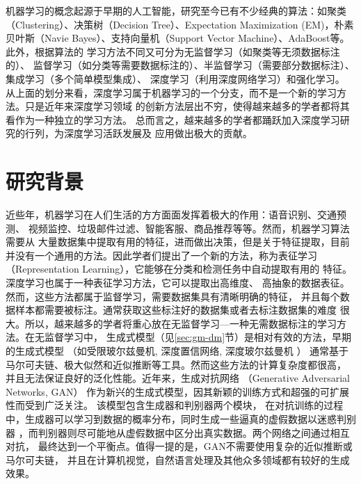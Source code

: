 机器学习的概念起源于早期的人工智能，研究至今已有不少经典的算法：如聚类（Clustering）、决策树（Decision Tree）、Expectation Maximization (EM)，朴素贝叶斯（Navie Bayes）、支持向量机（Support Vector Machine）、AdaBoost等。此外，根据算法的
学习方法不同又可分为无监督学习（如聚类等无须数据标注的）、
监督学习（如分类等需要数据标注的）、半监督学习（需要部分数据标注）、
集成学习（多个简单模型集成）、
深度学习（利用深度网络学习）和强化学习。
从上面的划分来看，深度学习属于机器学习的一个分支，而不是一个新的学习方法。只是近年来深度学习领域
的创新方法层出不穷，使得越来越多的学者都将其看作为一种独立的学习方法。
总而言之，越来越多的学者都踊跃加入深度学习研究的行列，为深度学习活跃发展及
应用做出极大的贡献。

\section{研究背景}
近些年，机器学习在人们生活的方方面面发挥着极大的作用：语音识别、交通预测、
视频监控、垃圾邮件过滤、智能客服、商品推荐等等。然而，机器学习算法需要从
大量数据集中提取有用的特征，进而做出决策，但是关于特征提取，目前并没有一个通用的方法。因此学者们提出了一个新的方法，称为表征学习
（Representation Learning），它能够在分类和检测任务中自动提取有用的
特征\cite{bengio2013representation}。
深度学习也属于一种表征学习方法，它可以提取出高维度、
高抽象的数据表征。然而，这些方法都属于监督学习，需要数据集具有清晰明确的特征，
并且每个数据样本都需要被标注。通常获取这些标注好的数据集或者去标注数据集的难度
很大。所以，越来越多的学者将重心放在无监督学习—一种无需数据标注的学习方法。在无监督学习中，
生成式模型（见\ref{sec:gm-dm}节）是相对有效的方法，早期的生成式模型
（如受限玻尔兹曼机\cite{smolensky1986information},
深度置信网络\cite{hinton2006fast}, 深度玻尔兹曼机\cite{salakhutdinov2009deep}
）
通常基于马尔可夫链、极大似然和近似推断等工具。然而这些方法的计算复杂度都很高，
并且无法保证良好的泛化性能。近年来，生成对抗网络
（Generative Adversarial Networks, GAN）\cite{goodfellow2014generative}
作为新兴的生成式模型，因其新颖的训练方式和超强的可扩展性而受到广泛关注。
该模型包含生成器和判别器两个模块，
在对抗训练的过程中，生成器可以学习到数据的概率分布，同时生成一些逼真的虚假数据以迷惑判别器
，而判别器则尽可能地从虚假数据中区分出真实数据。两个网络之间通过相互对抗，
最终达到一个平衡点。值得一提的是，GAN不需要使用复杂的近似推断或马尔可夫链，
并且在计算机视觉，自然语言处理及其他众多领域都有较好的生成效果。



